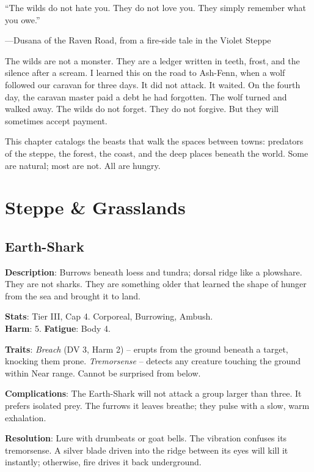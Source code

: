 
\epigraph{``The wilds do not hate you. They do not love you. They simply remember what you owe.''}{---Dusana of the Raven Road, from a fire-side tale in the Violet Steppe}

The wilds are not a monster. They are a ledger written in teeth, frost, and the silence after a scream. I learned this on the road to Ash-Fenn, when a wolf followed our caravan for three days. It did not attack. It waited. On the fourth day, the caravan master paid a debt he had forgotten. The wolf turned and walked away. The wilds do not forget. They do not forgive. But they will sometimes accept payment.

This chapter catalogs the beasts that walk the spaces between towns: predators of the steppe, the forest, the coast, and the deep places beneath the world. Some are natural; most are not. All are hungry.

\section*{Steppe & Grasslands}

\subsection*{Earth-Shark}

\noindent\textbf{Description}: Burrows beneath loess and tundra; dorsal ridge like a plowshare. They are not sharks. They are something older that learned the shape of hunger from the sea and brought it to land.

\noindent\textbf{Stats}: Tier III, Cap 4. Corporeal, Burrowing, Ambush.\\
\textbf{Harm}: 5. \textbf{Fatigue}: Body 4.

\noindent\textbf{Traits}: 
\emph{Breach} (DV 3, Harm 2) -- erupts from the ground beneath a target, knocking them prone. \emph{Tremorsense} -- detects any creature touching the ground within Near range. Cannot be surprised from below.

\noindent\textbf{Complications}: The Earth-Shark will not attack a group larger than three. It prefers isolated prey. The furrows it leaves breathe; they pulse with a slow, warm exhalation.

\noindent\textbf{Resolution}: Lure with drumbeats or goat bells. The vibration confuses its tremorsense. A silver blade driven into the ridge between its eyes will kill it instantly; otherwise, fire drives it back underground.

